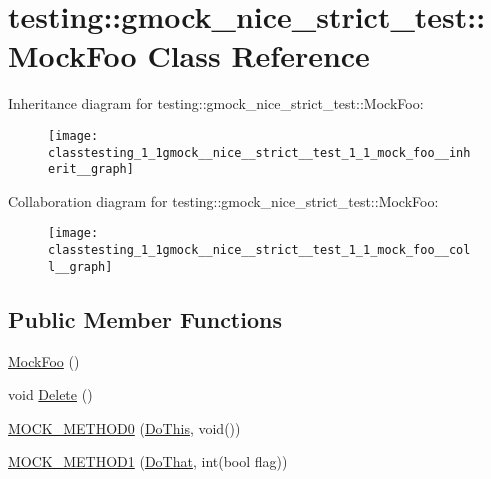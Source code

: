 \hypertarget{classtesting_1_1gmock__nice__strict__test_1_1_mock_foo}{}\section{testing\+:\+:gmock\+\_\+nice\+\_\+strict\+\_\+test\+:\+:Mock\+Foo Class Reference}
\label{classtesting_1_1gmock__nice__strict__test_1_1_mock_foo}


Inheritance diagram for testing\+:\+:gmock\+\_\+nice\+\_\+strict\+\_\+test\+:\+:Mock\+Foo\+:
\nopagebreak
\begin{figure}[H]
\begin{center}
\leavevmode
\texttt{[image: classtesting\_1\_1gmock\_\_nice\_\_strict\_\_test\_1\_1\_mock\_foo\_\_inherit\_\_graph]}
\end{center}
\end{figure}


Collaboration diagram for testing\+:\+:gmock\+\_\+nice\+\_\+strict\+\_\+test\+:\+:Mock\+Foo\+:
\nopagebreak
\begin{figure}[H]
\begin{center}
\leavevmode
\texttt{[image: classtesting\_1\_1gmock\_\_nice\_\_strict\_\_test\_1\_1\_mock\_foo\_\_coll\_\_graph]}
\end{center}
\end{figure}
\subsection*{Public Member Functions}
\begin{DoxyCompactItemize}
\item 
\hyperlink{classtesting_1_1gmock__nice__strict__test_1_1_mock_foo_a43a103497aa475d4b1700f5116b35ef3}{Mock\+Foo} ()
\item 
void \hyperlink{classtesting_1_1gmock__nice__strict__test_1_1_mock_foo_a7bdec6a6353e4396d551dbf8f2beac54}{Delete} ()
\item 
\hyperlink{classtesting_1_1gmock__nice__strict__test_1_1_mock_foo_a14ee661ebc461096824e876a9308840e}{M\+O\+C\+K\+\_\+\+M\+E\+T\+H\+O\+D0} (\hyperlink{classtesting_1_1gmock__nice__strict__test_1_1_foo_a79a3cdbd8d9d9f6bc87580563b0d7cec}{Do\+This}, void())
\item 
\hyperlink{classtesting_1_1gmock__nice__strict__test_1_1_mock_foo_a3a7bfcf303a2c8578db900c9525b02a1}{M\+O\+C\+K\+\_\+\+M\+E\+T\+H\+O\+D1} (\hyperlink{classtesting_1_1gmock__nice__strict__test_1_1_foo_a8527a459b03f333a809a3376311a9f8b}{Do\+That}, int(bool flag))
\end{DoxyCompactItemize}



